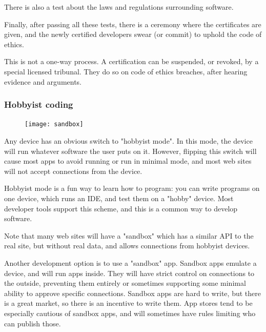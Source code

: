 There is also a test about the laws and regulations
surrounding software.

Finally, after passing all these tests,
there is a ceremony where the certificates are given,
and the newly certified developers swear
(or commit)
to uphold the code of ethics.

This is not a one-way process.
A certification can be suspended,
or revoked,
by a special licensed tribunal.
They do so on code of ethics breaches,
after hearing evidence and arguments.


\begin{frame}[fragile]
\frametitle{Hobbyist coding}

\begin{figure}
\texttt{[image: sandbox]}
\end{figure}

\end{frame}

Any device has an obvious switch to
"hobbyist mode".
In this mode,
the device will run whatever software the user puts on it.
However,
flipping this switch will cause most apps to avoid running
or run in minimal mode,
and most web sites will not accept connections from the device.

Hobbyist mode is a fun way to learn how to program:
you can write programs on one device,
which runs an IDE,
and test them on a "hobby" device.
Most developer tools support this scheme,
and this is a common way to develop software.

Note that many web sites will have a "sandbox" which has a similar API
to the real site,
but without real data,
and allows connections from hobbyist devices.

Another development option is to use a "sandbox" app.
Sandbox apps emulate a device,
and will run apps inside.
They will have strict control on connections to the outside,
preventing them entirely or sometimes supporting some minimal ability to
approve specific connections.
Sandbox apps are hard to write,
but there is a great market,
so there is an incentive to write them.
App stores tend to be especially cautious of sandbox apps,
and will sometimes have rules limiting who can publish those.


